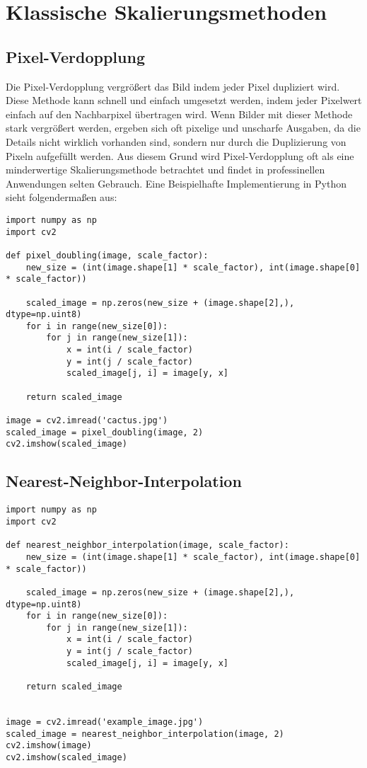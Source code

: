 
\chapter{Klassische Skalierungsmethoden}

\section{Pixel-Verdopplung}
Die Pixel-Verdopplung vergrößert das Bild indem jeder Pixel dupliziert wird.
Diese Methode kann schnell und einfach umgesetzt werden, indem jeder Pixelwert einfach auf den Nachbarpixel übertragen wird. 
Wenn Bilder mit dieser Methode stark vergrößert werden, ergeben sich oft pixelige und unscharfe Ausgaben, da die Details nicht wirklich vorhanden sind, sondern nur durch die Duplizierung von Pixeln aufgefüllt werden. 
Aus diesem Grund wird Pixel-Verdopplung oft als eine minderwertige Skalierungsmethode betrachtet und findet in professinellen Anwendungen selten Gebrauch.
\newpage
Eine Beispielhafte Implementierung in Python sieht folgendermaßen aus: 
\begin{lstlisting}
import numpy as np
import cv2

def pixel_doubling(image, scale_factor):
    new_size = (int(image.shape[1] * scale_factor), int(image.shape[0] * scale_factor))
    
    scaled_image = np.zeros(new_size + (image.shape[2],), dtype=np.uint8)
    for i in range(new_size[0]):
        for j in range(new_size[1]):
            x = int(i / scale_factor)
            y = int(j / scale_factor)
            scaled_image[j, i] = image[y, x]
    
    return scaled_image

image = cv2.imread('cactus.jpg')
scaled_image = pixel_doubling(image, 2)
cv2.imshow(scaled_image)
\end{lstlisting}
\section{Nearest-Neighbor-Interpolation}

\begin{lstlisting}
import numpy as np
import cv2

def nearest_neighbor_interpolation(image, scale_factor):
    new_size = (int(image.shape[1] * scale_factor), int(image.shape[0] * scale_factor))
    
    scaled_image = np.zeros(new_size + (image.shape[2],), dtype=np.uint8)
    for i in range(new_size[0]):
        for j in range(new_size[1]):
            x = int(i / scale_factor)
            y = int(j / scale_factor)
            scaled_image[j, i] = image[y, x]
    
    return scaled_image


image = cv2.imread('example_image.jpg')
scaled_image = nearest_neighbor_interpolation(image, 2)
cv2.imshow(image)
cv2.imshow(scaled_image)
\end{lstlisting}
